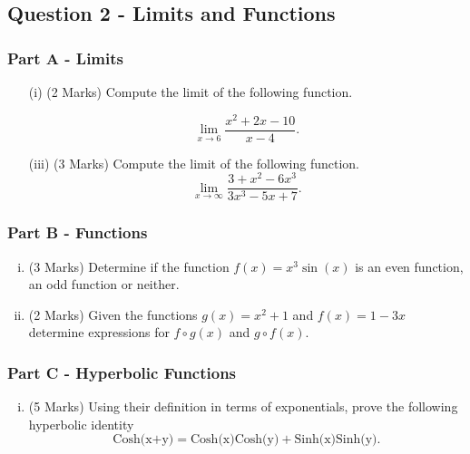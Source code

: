 \documentclass[a4paper,12pt]{article}
\begin{document}
\newpage
\subsection*{Question 2 - Limits and Functions}
\subsubsection*{Part A - Limits}
\begin{enumerate}
	\item[(i)] (2 Marks)  Compute the limit of the following function.
	
	\[\lim_{x \to 6 } \frac{x^2 + 2x-10}{x-4}.\]
		
		\bigskip
	
	\item[(iii)] (3 Marks) Compute the limit of the following function.
	\[ \lim_{x \to \infty } \frac{3 + x^2 - 6x^3 }{3x^3 - 5x + 7}. \]	
	
\end{enumerate}

\subsubsection*{Part B - Functions}
\begin{enumerate}[(i)]
	\item (3 Marks) Determine if the function $f(x) = x^3\sin(x)$ is an even function, an odd function or neither.
	\bigskip
	\item (2 Marks) Given the functions $g(x) = x^2+1$ and $f(x) = 1-3x$ determine expressions for $f \circ g(x)$ and $g \circ f(x)$.
\end{enumerate}
	\bigskip
\subsubsection*{Part C - Hyperbolic Functions}


\begin{enumerate}[(i)]
	\item (5 Marks) Using their definition in terms of exponentials, prove the following hyperbolic identity  \[ \mbox{Cosh(x+y)} = \mbox{Cosh(x)Cosh(y)} + \mbox{Sinh(x)Sinh(y)}.\]
	
\end{enumerate}
\newpage
\end{document}
